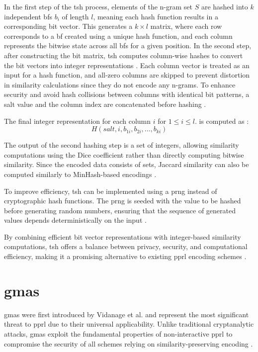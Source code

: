 In the first step of the \ac{tsh} process, elements of the n-gram set \(S\) are hashed into \(k\) independent \ac{bf}s \(b_i\) of length \(l\), meaning each hash function results in a corresponding bit vector.
This generates a \(k \times l\) matrix, where each row corresponds to a \ac{bf} created using a unique hash function, and each column represents the bitwise state across all \ac{bf}s for a given position.
In the second step, after constructing the bit matrix, \ac{tsh} computes column-wise hashes to convert the bit vectors into integer representations .
Each column vector is treated as an input for a hash function, and all-zero columns are skipped to prevent distortion in similarity calculations since they do not encode any n-grams.
To enhance security and avoid hash collisions between columns with identical bit patterns, a salt value and the column index are concatenated before hashing \cite{schaefer2024, vidanage2020graph}.

The final integer representation for each column $i$ for $1 \leq i \leq l$. is computed as \cite{schaefer2024}:
\begin{equation}
    H(salt, i, b_{1i}, b_{2i}, ..., b_{ki})
\end{equation}

The output of the second hashing step is a set of integers, allowing similarity computations using the Dice coefficient rather than directly computing bitwise similarity.
Since the encoded data consists of sets, Jaccard similarity can also be computed similarly to MinHash-based encodings \cite{schaefer2024}.

To improve efficiency, \ac{tsh} can be implemented using a \ac{prng} instead of cryptographic hash functions.
The \ac{prng} is seeded with the value to be hashed before generating random numbers, ensuring that the sequence of generated values depends deterministically on the input \cite{schaefer2024}.

By combining efficient bit vector representations with integer-based similarity computations, \ac{tsh} offers a balance between privacy, security, and computational efficiency, making it a promising alternative to existing \ac{pprl} encoding schemes \cite{vidanage2020graph, schaefer2024}.

\section{\ac{gma}s} \label{sec:gma}

\ac{gma}s  were first introduced by Vidanage et al. \cite{vidanage2020graph} and represent the most significant threat to \ac{pprl} due to their universal applicability.
Unlike traditional cryptanalytic attacks, \ac{gma}s exploit the fundamental properties of non-interactive \ac{pprl} to compromise the security of all schemes relying on similarity-preserving encoding \cite{schaefer2024}.


